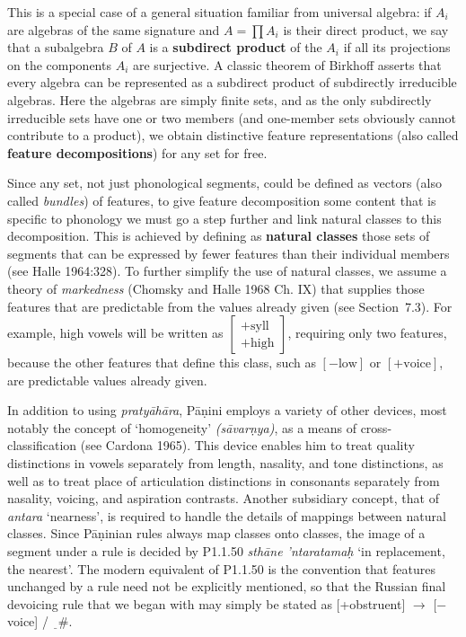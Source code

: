 This is a special case of a general situation familiar from universal algebra:
if $A_i$ are algebras of the same signature and $A = \prod A_i$ is their
direct product, we say that a subalgebra $B$ of $A$ is a {\bf subdirect
  product} of the $A_i$ if all its projections on the components $A_i$ are
surjective.  A classic theorem of Birkhoff
asserts that every algebra can be represented as a subdirect product of
subdirectly irreducible algebras.  Here the algebras are simply finite sets,
and as the only subdirectly irreducible sets have one or two members (and
one-member sets obviously cannot contribute to a product), we obtain
distinctive feature representations (also called {\bf feature
  decompositions}) for any set for free.

Since any set, not just phonological segments, could be defined as vectors
(also called {\it bundles}) of features,  to give
feature decomposition some content that is specific to phonology we must go a
step further and link natural classes to this decomposition.  This is achieved
by defining as {\bf natural classes} those sets of segments that can be
expressed by fewer features than their individual members \nocite{Halle:1964}
(see Halle 1964:328).   To further simplify the
use of natural classes, we assume a theory of {\it
  markedness} (Chomsky and Halle 1968 Ch. IX) that supplies
those features that are predictable from the values already given (see
Section~7.3).  For example, high vowels will be written as $\left[
\begin{array}{c}+\text{syll}\\+\text{high}\end{array}\right]$, requiring only
two features, because the other features that define this class, such as
$[-\text{low}]$ or $[+\text{voice}]$, are predictable values already given.

In addition to using {\it praty\={a}h\={a}ra}, P\={a}\d{n}ini employs a
variety of other devices, most notably the concept of `homogeneity' {\it
  (s\={a}var\d{n}ya)}, as a means of cross-classification
(see\nocite{Cardona:1965} Cardona 1965). This device
enables him to treat quality distinctions in vowels separately from length,
nasality, and tone distinctions, as well as to treat place of articulation
distinctions in consonants separately from nasality, voicing, and aspiration
contrasts. Another subsidiary concept, that of {\it antara} 
`nearness', is required to handle the details of mappings between natural
classes. Since P\={a}\d{n}inian rules always map classes onto classes, the
image of a segment under a rule is decided by P1.1.50 {\it sth\={a}ne
'ntaratama\d{h}} `in replacement, the nearest'. The modern equivalent of
P1.1.50 is the convention that features unchanged by a rule need not be
explicitly mentioned, so that the Russian final devoicing rule that we began
with may simply be stated as [+obstruent] $\rightarrow$ [$-$voice] /
$\underline{\ \ }\#$. 

